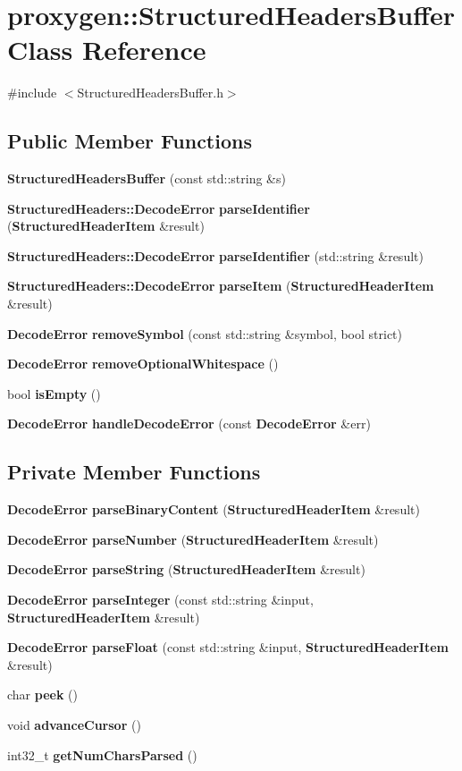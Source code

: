 \section{proxygen\+:\+:Structured\+Headers\+Buffer Class Reference}
\label{classproxygen_1_1StructuredHeadersBuffer}


{\ttfamily \#include $<$Structured\+Headers\+Buffer.\+h$>$}

\subsection*{Public Member Functions}
\begin{DoxyCompactItemize}
\item 
{\bf Structured\+Headers\+Buffer} (const std\+::string \&s)
\item 
{\bf Structured\+Headers\+::\+Decode\+Error} {\bf parse\+Identifier} ({\bf Structured\+Header\+Item} \&result)
\item 
{\bf Structured\+Headers\+::\+Decode\+Error} {\bf parse\+Identifier} (std\+::string \&result)
\item 
{\bf Structured\+Headers\+::\+Decode\+Error} {\bf parse\+Item} ({\bf Structured\+Header\+Item} \&result)
\item 
{\bf Decode\+Error} {\bf remove\+Symbol} (const std\+::string \&symbol, bool strict)
\item 
{\bf Decode\+Error} {\bf remove\+Optional\+Whitespace} ()
\item 
bool {\bf is\+Empty} ()
\item 
{\bf Decode\+Error} {\bf handle\+Decode\+Error} (const {\bf Decode\+Error} \&err)
\end{DoxyCompactItemize}
\subsection*{Private Member Functions}
\begin{DoxyCompactItemize}
\item 
{\bf Decode\+Error} {\bf parse\+Binary\+Content} ({\bf Structured\+Header\+Item} \&result)
\item 
{\bf Decode\+Error} {\bf parse\+Number} ({\bf Structured\+Header\+Item} \&result)
\item 
{\bf Decode\+Error} {\bf parse\+String} ({\bf Structured\+Header\+Item} \&result)
\item 
{\bf Decode\+Error} {\bf parse\+Integer} (const std\+::string \&input, {\bf Structured\+Header\+Item} \&result)
\item 
{\bf Decode\+Error} {\bf parse\+Float} (const std\+::string \&input, {\bf Structured\+Header\+Item} \&result)
\item 
char {\bf peek} ()
\item 
void {\bf advance\+Cursor} ()
\item 
int32\+\_\+t {\bf get\+Num\+Chars\+Parsed} ()
\end{DoxyCompactItemize}
